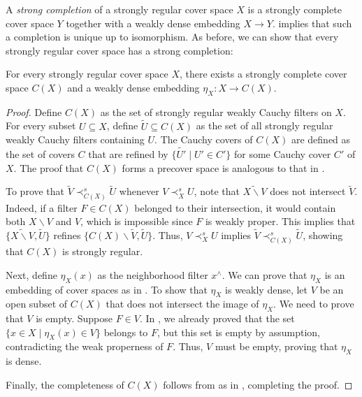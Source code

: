 \documentclass[reqno]{amsart}
\theoremstyle{definition}
\theoremstyle{remark}
\numberwithin{figure}{section}
\newcommand{\rb}{\prec}
\begin{document}
A \emph{strong completion} of a strongly regular cover space $X$ is a strongly complete cover space $Y$ together with a weakly dense embedding $X \to Y$.
 implies that such a completion is unique up to isomorphism.
As before, we can show that every strongly regular cover space has a strong completion:

\begin{thm}
For every strongly regular cover space $X$, there exists a strongly complete cover space $C(X)$ and a weakly dense embedding $\eta_X : X \to C(X)$.
\end{thm}
\begin{proof}
Define $C(X)$ as the set of strongly regular weakly Cauchy filters on $X$.
For every subset $U \subseteq X$, define $\widetilde{U} \subseteq C(X)$ as the set of all strongly regular weakly Cauchy filters containing $U$.
The Cauchy covers of $C(X)$ are defined as the set of covers $C$ that are refined by $\{ \widetilde{U'} \mid U' \in C' \}$ for some Cauchy cover $C'$ of $X$.
The proof that $C(X)$ forms a precover space is analogous to that in .

To prove that $\widetilde{V} \rb^s_{C(X)} \widetilde{U}$ whenever $V \rb^s_X U$, note that $\widetilde{X \backslash V}$ does not intersect $\widetilde{V}$.
Indeed, if a filter $F \in C(X)$ belonged to their intersection, it would contain both $X \backslash V$ and $V$, which is impossible since $F$ is weakly proper.
This implies that $\{ \widetilde{X \backslash V}, \widetilde{U} \}$ refines $\{ C(X) \backslash \widetilde{V}, \widetilde{U} \}$.
Thus, $V \rb^s_X U$ implies $\widetilde{V} \rb^s_{C(X)} \widetilde{U}$, showing that $C(X)$ is strongly regular.

Next, define $\eta_X(x)$ as the neighborhood filter $x^\wedge$.
We can prove that $\eta_X$ is an embedding of cover spaces as in .
To show that $\eta_X$ is weakly dense, let $V$ be an open subset of $C(X)$ that does not intersect the image of $\eta_X$.
We need to prove that $V$ is empty.
Suppose $F \in V$.
In , we already proved that the set $\{ x \in X \mid \eta_X(x) \in V \}$ belongs to $F$, but this set is empty by assumption, contradicting the weak properness of $F$.
Thus, $V$ must be empty, proving that $\eta_X$ is dense.

Finally, the completeness of $C(X)$ follows from  as in , completing the proof.
\end{proof}
\end{document}
